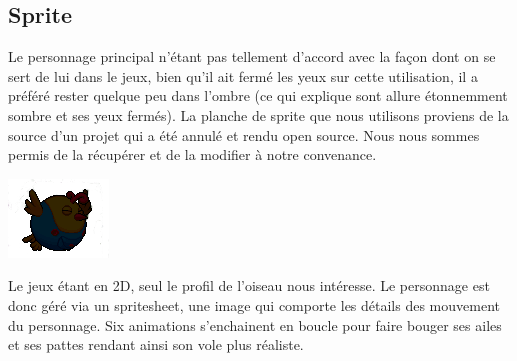 \documentclass [11pt]{report}
\begin{document}
	\vspace{15mm}
	
	\subsection {Sprite}
	Le personnage principal n'étant pas tellement d'accord avec la façon dont on se sert de lui dans le jeux, bien qu'il ait fermé les yeux sur cette utilisation, il a préféré rester quelque peu dans l'ombre (ce qui explique sont allure étonnemment sombre et ses yeux fermés).
	La planche de sprite que nous utilisons proviens de la source d'un projet qui a été annulé et rendu open source. Nous nous sommes permis de la récupérer et de la modifier à notre convenance.
	
	\vspace{4mm}
		
		\begin{center}
		\includegraphics[scale=0.5]{images/bird.png}
		\end{center}
		
	\vspace{10mm}
		
	Le jeux étant en 2D, seul le profil de l'oiseau nous intéresse. Le personnage est donc géré via un spritesheet, une image qui comporte les détails des mouvement du personnage. Six animations s'enchainent en boucle pour faire bouger ses ailes et ses pattes rendant ainsi son vole plus réaliste.
	
	
\newpage
\end{document}
